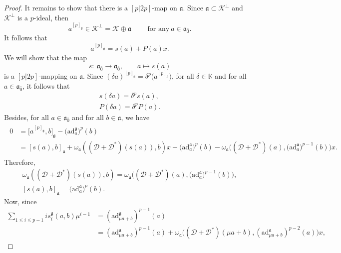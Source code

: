 \documentclass[pdftex]{sigma}
\numberwithin{equation}{section}
\begin{document}
\begin{proof}
It remains to show that there is a $[p|2p]$-map on $\mathfrak{a}$. Since $\mathfrak{a} \subset \mathscr{K}^\perp$ and ${\mathscr K}^\perp$ is a $p$-ideal, then
\[
a^{[p]_\mathfrak{g}}\in \mathscr{K}^\perp=\mathscr{K} \oplus \mathfrak{a} \qquad \text{ for any} \ a \in \mathfrak{a}_{\bar 0}.
\]
It follows that
\begin{equation*}
a^{[p]_\mathfrak{g}}=s(a)+P(a)x.
\end{equation*}
We will show that the map
\[
s\colon \ \mathfrak{a}_{\bar 0} \rightarrow \mathfrak{a}_{\bar 0}, \qquad a\mapsto s(a)
\]
is a $[p|2p]$-mapping on $\mathfrak{a}$.
Since $(\delta a)^{[p]_\mathfrak{g}}=\delta ^p\bigl(a^{[p]_\mathfrak{g}}\bigr)$, for all $\delta \in \mathbb K$ and for all $a\in \mathfrak{a}_{\bar 0} $, it follows that
\begin{gather}
s(\delta a) = \delta^p s(a),\label{rescond1rec}\\
P(\delta a) = \delta^p P(a).\label{Pcond1rec}
\end{gather}
Besides, for all $a\in \mathfrak{a}_{\bar 0}$ and for all $b\in \mathfrak{a}$, we have
\begin{align*}
\begin{split}
0&=\big[a^{[p]_\mathfrak{g}},b\big]_\mathfrak{g}-\bigl(\mathrm{ad}_a^\mathfrak{g}\bigr)^{p}(b)\\
&=[s(a),b]_\mathfrak{a}+\omega_\mathfrak{a}(({\mathscr D} + {\mathscr D}^*)(s(a)), b) x -\bigl(\mathrm{ad}_a^\mathfrak{a}\bigr)^p(b)- \omega_\mathfrak{a}\bigl(({\mathscr D} + {\mathscr D}^*)(a),\bigl(\mathrm{ad}_a^\mathfrak{a}\bigr)^{p-1}(b)\bigr) x.
\end{split}
\end{align*}
Therefore,
\begin{gather}
\omega_\mathfrak{a}(({\mathscr D}+{\mathscr D}^*)(s(a)), b) = \omega_\mathfrak{a}\bigl(({\mathscr D}+{\mathscr D}^*)(a),
\bigl(\mathrm{ad}_a^\mathfrak{a}\bigr)^{p-1}(b)\bigr) ,\label{cocycondrec}\\
[s(a),b]_\mathfrak{a} = \bigl(\mathrm{ad}_a^\mathfrak{a}\bigr)^p(b). \label{rescondrec}
\end{gather}
Now, since
\begin{align*}
 \sum_{1\leq i \leq p-1} is_i^\mathfrak{g}(a,b) \mu^{i-1}&=(\mathrm{ad}_{\mu a+b}^\mathfrak{g})^{p-1}(a)\\
&=(\mathrm{ad}_{\mu a+b}^\mathfrak{a})^{p-1}(a)+\omega_\mathfrak{a}\bigl(({\mathscr D}+{\mathscr D}^*)(\mu a+b),(\mathrm{ad}_{\mu a+b}^\mathfrak{a})^{p-2}(a) \bigr)x,
\end{align*}

\end{proof}
\end{document}
